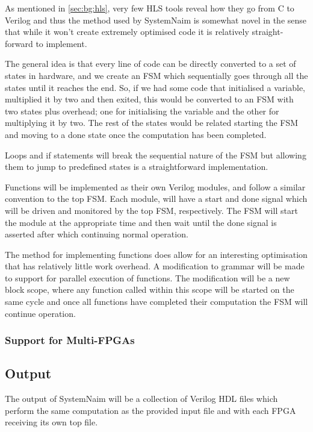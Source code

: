 As mentioned in \autoref{sec:bg:hls}, very few HLS tools reveal how they go from C to Verilog and thus the method used by SystemNaim is somewhat novel in the sense that while it won't create extremely optimised code it is relatively straight-forward to implement. 

The general idea is that every line of code can be directly converted to a set of states in hardware, and we create an FSM which sequentially goes through all the states until it reaches the end. So, if we had some code that initialised a variable, multiplied it by two and then exited, this would be converted to an FSM with two states plus overhead; one for initialising the variable and the other for multiplying it by two. The rest of the states would be related starting the FSM and moving to a done state once the computation has been completed.

Loops and if statements will break the sequential nature of the FSM but allowing them to jump to predefined states is a straightforward implementation.

Functions will be implemented as their own Verilog modules, and follow a similar convention to the top FSM. Each module, will have a start and done signal which will be driven and monitored by the top FSM, respectively. The FSM will start the module at the appropriate time and then wait until the done signal is asserted after which continuing normal operation.

The method for implementing functions does allow for an interesting optimisation that has relatively little work overhead. A modification to grammar will be made to support for parallel execution of functions. The modification will be a new block scope, where any function called within this scope will be started on the same cycle and once all functions have completed their computation the FSM will continue operation.

\subsubsection{Support for Multi-FPGAs}



\subsection{Output}

The output of SystemNaim will be a collection of Verilog HDL files which perform the same computation as the provided input file and with each FPGA receiving its own top file.

